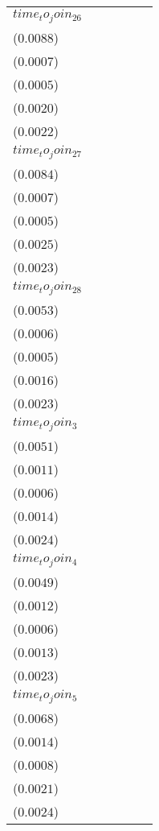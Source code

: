 \begin{tabular}{llllll}
$time_to_join_26$  &   \makecell{$0.0066^{}$ \\ ($0.0088$)} &  \makecell{$-0.0003^{}$ \\ ($0.0007$)} &  \makecell{$-0.0004^{}$ \\ ($0.0005$)} &   \makecell{$0.0019^{}$ \\ ($0.0020$)} &   \makecell{$0.0015^{}$ \\ ($0.0022$)} \\
$time_to_join_27$  &   \makecell{$0.0082^{}$ \\ ($0.0084$)} &  \makecell{$-0.0001^{}$ \\ ($0.0007$)} &  \makecell{$-0.0003^{}$ \\ ($0.0005$)} &   \makecell{$0.0029^{}$ \\ ($0.0025$)} &   \makecell{$0.0016^{}$ \\ ($0.0023$)} \\
$time_to_join_28$  &   \makecell{$0.0041^{}$ \\ ($0.0053$)} &  \makecell{$-0.0002^{}$ \\ ($0.0006$)} &  \makecell{$-0.0005^{}$ \\ ($0.0005$)} &   \makecell{$0.0018^{}$ \\ ($0.0016$)} &   \makecell{$0.0015^{}$ \\ ($0.0023$)} \\
$time_to_join_3$   &  \makecell{$-0.0046^{}$ \\ ($0.0051$)} &  \makecell{$-0.0006^{}$ \\ ($0.0011$)} &  \makecell{$-0.0004^{}$ \\ ($0.0006$)} &  \makecell{$-0.0006^{}$ \\ ($0.0014$)} &   \makecell{$0.0019^{}$ \\ ($0.0024$)} \\
$time_to_join_4$   &  \makecell{$-0.0058^{}$ \\ ($0.0049$)} &  \makecell{$-0.0006^{}$ \\ ($0.0012$)} &  \makecell{$-0.0004^{}$ \\ ($0.0006$)} &  \makecell{$-0.0010^{}$ \\ ($0.0013$)} &   \makecell{$0.0018^{}$ \\ ($0.0023$)} \\
$time_to_join_5$   &  \makecell{$-0.0017^{}$ \\ ($0.0068$)} &  \makecell{$-0.0002^{}$ \\ ($0.0014$)} &  \makecell{$-0.0002^{}$ \\ ($0.0008$)} &   \makecell{$0.0004^{}$ \\ ($0.0021$)} &   \makecell{$0.0017^{}$ \\ ($0.0024$)} \\

\end{tabular}
